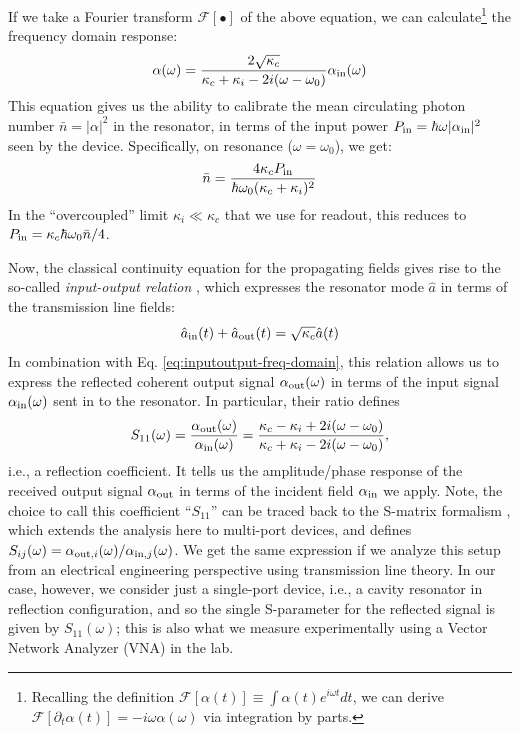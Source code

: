 If we take a Fourier transform $\mathcal{F}[\bullet]$ of the above equation, we can calculate\footnote{Recalling the definition $\mathcal{F}[\alpha(t)] \equiv \int \alpha(t) e^{i\omega t}dt$, we can derive $\mathcal{F}[\partial_t\alpha(t)] = -i\omega \alpha(\omega)$ via integration by parts.} the frequency domain response:
\begin{equation}
    \alpha(\omega) = \frac{2\sqrt{\kappa_c}}{\kappa_c + \kappa_i - 2i(\omega-\omega_0)} \alpha_{\rm in}(\omega)
    \label{eq:inputoutput-freq-domain}
\end{equation}
This equation gives us the ability to calibrate the mean circulating photon number $\bar{n} = |\alpha|^2$ in the resonator, in terms of the input power $P_{\rm in} = \hbar\omega |\alpha_{\rm in}|^2$ seen by the device. Specifically, on resonance ($\omega = \omega_0$), we get:
\begin{equation}
    \bar{n} = \frac{4\kappa_c P_{\rm in}}{\hbar\omega_0(\kappa_c + \kappa_i)^2}
\end{equation}
In the ``overcoupled'' limit $\kappa_i \ll \kappa_c$ that we use for readout, this reduces to $P_{\rm in} = \kappa_c\hbar\omega_0 \bar{n}/4$. 

\noindent Now, the classical continuity equation for the propagating fields gives rise to the so-called \textit{input-output relation} \cite{clerk2010introduction}, which expresses the resonator mode $\hat{a}$ in terms of the transmission line fields: 
\begin{equation}
    \hat{a}_{\rm in}(t) + \hat{a}_{\rm out}(t) = \sqrt{\kappa_c} \hat{a}(t)
    \label{eq:inputoutput}
\end{equation}
In combination with Eq. \eqref{eq:inputoutput-freq-domain}, this relation allows us to express the reflected coherent output signal $\alpha_{\rm out}(\omega)$ in terms of the input signal $\alpha_{\rm in}(\omega)$ sent in to the resonator. In particular, their ratio defines
\begin{equation}
   S_{11}(\omega) = \frac{\alpha_{\rm out}(\omega)}{\alpha_{\rm in}(\omega)} = \frac{\kappa_c - \kappa_i + 2i(\omega - \omega_0)}{\kappa_c + \kappa_i - 2i(\omega - \omega_0)},
   \label{eq:A_S11_ideal}
\end{equation}
i.e., a reflection coefficient. It tells us the amplitude/phase response of the received output signal  $\alpha_{\rm out}$ in terms of the incident field $\alpha_{\rm in}$ we apply. Note, the choice to call this coefficient ``$S_{11}$'' can be traced back to the S-matrix formalism \cite{kurokawa1965power, gardiner1985input}, which extends the analysis here to multi-port devices, and defines $S_{ij}(\omega) = \alpha_{{\rm out}, i}(\omega)/\alpha_{{\rm in}, j}(\omega)$. We get the same expression if we analyze this setup from an electrical engineering perspective using transmission line theory. In our case, however, we consider just a single-port device, i.e., a cavity resonator in reflection configuration, and so the single S-parameter for the reflected signal is given by $S_{11}(\omega)$; this is also what we measure experimentally using a Vector Network Analyzer (VNA) in the lab.  

